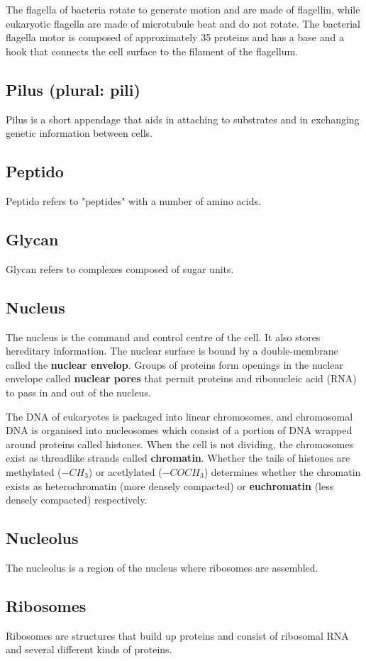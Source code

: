 \documentclass[11pt]{article}
\begin{document}
The flagella of bacteria rotate to generate motion and are made of flagellin, while eukaryotic flagella are made of microtubule beat and do not rotate. The bacterial flagella motor is composed of approximately 35 proteins and has a base and a hook that connects the cell surface to the filament of the flagellum.
\subsection{Pilus (plural: pili)}
\label{sec:org73efc51}
Pilus is a short appendage that aids in attaching to substrates and in exchanging genetic information between cells.
\subsection{Peptido}
\label{sec:org5acdc97}
Peptido refers to "peptides" with a number of amino acids.
\subsection{Glycan}
\label{sec:org195eda9}
Glycan refers to complexes composed of sugar units.
\subsection{Nucleus}
\label{sec:org4a379e4}
The nucleus is the command and control centre of the cell. It also stores hereditary information. The nuclear surface is bound by a double-membrane called the \textbf{nuclear envelop}. Groups of proteins form openings in the nuclear envelope called \textbf{nuclear pores} that permit proteins and ribonucleic acid (RNA) to pass in and out of the nucleus.


The DNA of eukaryotes is packaged into linear chromosomes, and chromosomal DNA is organised into nucleosomes which consist of a portion of DNA wrapped around proteins called histones. When the cell is not dividing, the chromosomes exist as threadlike strands called \textbf{chromatin}. Whether the tails of histones are methylated (\(-CH_3\)) or acetlylated (\(-COCH_3\)) determines whether the chromatin exists as heterochromatin (more densely compacted) or \textbf{euchromatin} (less densely compacted) respectively.
\subsection{Nucleolus}
\label{sec:org809a78f}
The nucleolus is a region of the nucleus where ribosomes are assembled.
\subsection{Ribosomes}
\label{sec:orgfca5bec}
Ribosomes are structures that build up proteins and consist of ribosomal RNA and several different kinds of proteins.
\end{document}
